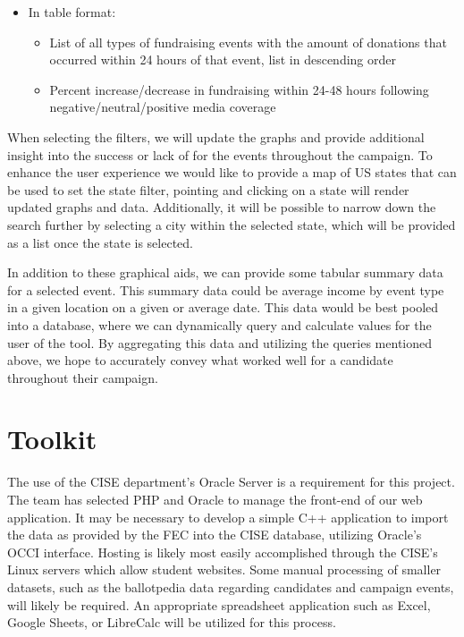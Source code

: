 \documentclass[12pt]{article}
\begin{document}
\begin{itemize}
\item In table format:
    \begin{itemize} 
     
        \item List of all types of fundraising events with the amount of donations that occurred within 24 hours of that event, list in descending order
        \item Percent increase/decrease in fundraising within 24-48 hours following negative/neutral/positive media coverage
    \end{itemize}
\end{itemize}
    When selecting the filters, we will update the graphs and provide additional insight into the success or lack of for the events throughout the campaign. To enhance the user experience we would like to provide a map of US states that can be used to set the state filter, pointing and clicking on a state will render updated graphs and data. Additionally, it will be possible to narrow down the search further by selecting a city within the selected state, which will be provided as a list once the state is selected.

In addition to these graphical aids, we can provide some tabular summary data for a selected event. This summary data could be average income by event type in a given location on a given or average date. This data would be best pooled into a database, where we can dynamically query and calculate values for the user of the tool. By aggregating this data and utilizing the queries mentioned above, we hope to accurately convey what worked well for a candidate throughout their campaign.

\section{Toolkit}

The use of the CISE department’s Oracle Server is a requirement for this project. The team has selected PHP and Oracle to manage the front-end of our web application. It may be necessary to develop a simple C++ application to import the data as provided by the FEC into the CISE database, utilizing Oracle’s OCCI interface. Hosting is likely most easily accomplished through the CISE’s Linux servers which allow student websites. Some manual processing of smaller datasets, such as the ballotpedia data regarding candidates and campaign events, will likely be required. An appropriate spreadsheet application such as Excel, Google Sheets, or LibreCalc will be utilized for this process. 
\end{document}
